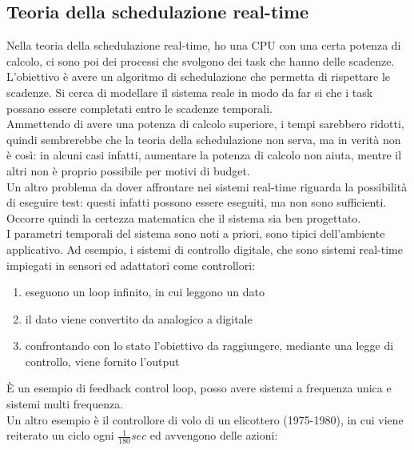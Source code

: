 \documentclass{article}
\begin{document}
\subsection{Teoria della schedulazione real-time}
Nella teoria della schedulazione real-time, ho una CPU con una certa potenza di calcolo, ci sono poi dei processi che svolgono dei task che hanno delle scadenze. L'obiettivo è avere un algoritmo di schedulazione che permetta di rispettare le scadenze. Si cerca di modellare il sistema reale in modo da far si che i task possano essere completati entro le scadenze temporali.\\ Ammettendo di avere una potenza di calcolo superiore, i tempi sarebbero ridotti, quindi sembrerebbe che la teoria della schedulazione non serva, ma in verità non è così: in alcuni casi infatti, aumentare la potenza di calcolo non aiuta, mentre il altri non è proprio possibile per motivi di budget.\\ Un altro problema da dover affrontare nei sistemi real-time riguarda la possibilità di eseguire test: questi infatti possono essere eseguiti, ma non sono sufficienti. Occorre quindi la certezza matematica che il sistema sia ben progettato.\\ I parametri temporali del sistema sono noti a priori, sono tipici dell'ambiente applicativo. Ad esempio, i sistemi di controllo digitale, che sono sistemi real-time impiegati in sensori ed adattatori come controllori: 
\begin{enumerate}
\item eseguono un loop infinito, in cui leggono un dato
\item il dato viene convertito da analogico a digitale
\item confrontando con lo stato l'obiettivo da raggiungere, mediante una legge di controllo, viene fornito l'output
\end{enumerate}
È un esempio di feedback control loop, posso avere sistemi a frequenza unica e sistemi multi frequenza.\\ Un altro esempio è il controllore di volo di un elicottero (1975-1980), in cui viene reiterato un ciclo ogni $\frac{1}{180}sec$ ed avvengono delle azioni: 
\end{document}
